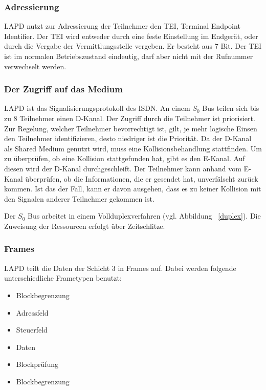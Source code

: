 \documentclass[12pt, a4paper, ngerman]{article}
\begin{document}
\subsubsection{Adressierung \label{tei}}
LAPD nutzt zur Adressierung der Teilnehmer den TEI, Terminal Endpoint Identifier. Der TEI wird entweder durch eine feste Einstellung im Endgerät, oder durch die Vergabe der Vermittlungsstelle vergeben. Er besteht aus 7 Bit. Der TEI ist im normalen Betriebszustand eindeutig, darf aber nicht mit der Rufnummer verwechselt werden.

\subsubsection{Der Zugriff auf das Medium}
LAPD ist das Signalisierungsprotokoll des ISDN. An einem $S_0$ Bus teilen sich bis zu 8 Teilnehmer einen D-Kanal. Der Zugriff durch die Teilnehmer ist priorisiert. Zur Regelung, welcher Teilnehmer bevorrechtigt ist, gilt, je mehr logische Einsen den Teilnehmer identifizieren, desto niedriger ist die Priorität. Da der D-Kanal als Shared Medium genutzt wird, muss eine Kollisionsbehandlung stattfinden. Um zu überprüfen, ob eine Kollision stattgefunden hat, gibt es den E-Kanal. Auf diesen wird der D-Kanal durchgeschleift. Der Teilnehmer kann anhand vom E-Kanal überprüfen, ob die Informationen, die er gesendet hat, unverfälscht zurück kommen. Ist das der Fall, kann er davon ausgehen, dass es zu keiner Kollision mit den Signalen anderer Teilnehmer gekommen ist.

Der $S_0$ Bus arbeitet in einem Vollduplexverfahren (vgl. Abbildung ~\ref{duplex}). Die Zuweisung der Ressourcen erfolgt über Zeitschlitze.


\subsubsection{Frames}
LAPD teilt die Daten der Schicht 3 in Frames auf. Dabei werden folgende unterschiedliche Frametypen benutzt:

\begin{itemize}
	\item Blockbegrenzung
	\item Adressfeld
	\item Steuerfeld
	\item Daten
	\item Blockprüfung
	\item Blockbegrenzung
\end{itemize}
\end{document}
